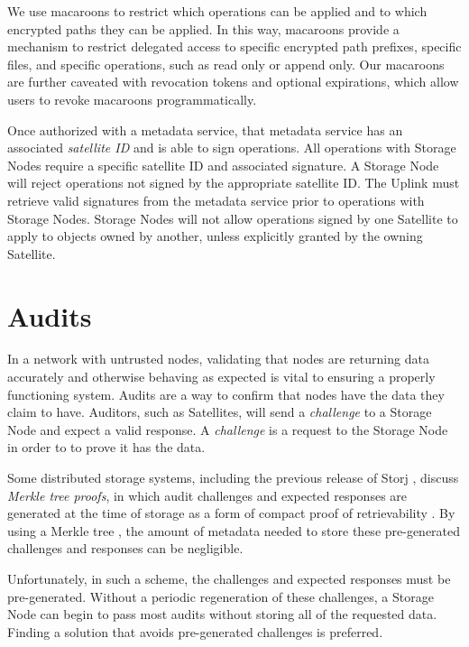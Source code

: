 \documentclass[8pt,fleqn,openany]{book}
\begin{document}
We use macaroons to restrict which operations can be applied and to which
encrypted paths they can be applied. In this way, macaroons provide a
mechanism to restrict delegated access to specific encrypted path prefixes,
specific files, and specific operations, such as read only or append only.
Our macaroons are further caveated with revocation tokens and optional
expirations, which allow users to revoke macaroons programmatically.

Once authorized with a metadata service, that metadata service has an associated
{\em satellite ID} and is able to sign operations. All
operations with Storage Nodes require a specific satellite ID and associated
signature. A Storage Node will reject operations not signed by the appropriate
satellite ID. The Uplink must retrieve valid signatures from the metadata
service prior to operations with Storage Nodes. Storage Nodes will not allow
operations signed by one Satellite to apply to objects owned by another, unless
explicitly granted by the owning Satellite.

\section{Audits}\label{sec:concrete-audits}

In a network with untrusted nodes, validating that nodes are returning data
accurately and otherwise behaving as expected is vital to ensuring a properly
functioning system. Audits are a way to confirm that nodes have the data they
claim to have. Auditors, such as Satellites, will send a {\em challenge} to a
Storage Node and expect a valid response. A {\em challenge} is a request to the
Storage Node in order to to prove it has the data.

Some distributed storage systems, including the previous release of Storj
\cite{storj-v2}, discuss {\em Merkle tree proofs}, in which audit challenges
and expected responses are generated at the time of storage as a form of compact
proof of retrievability \cite{proof-of-retrievability}. By using a Merkle tree
\cite{merkle-tree}, the amount of metadata needed to store these pre-generated
challenges and responses can be negligible.

Unfortunately, in such a scheme, the challenges and expected responses must be
pre-generated. Without a periodic regeneration of these challenges, a
Storage Node can begin to pass most audits without storing all of the requested
data. Finding a solution that avoids pre-generated challenges is preferred.
\end{document}
